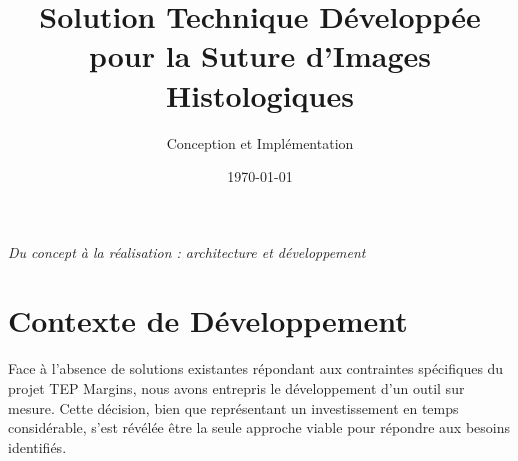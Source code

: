 \documentclass[11pt,a4paper]{article}
\title{\Huge\textbf{Solution Technique Développée\\pour la Suture d'Images Histologiques}}
\author{\Large Conception et Implémentation}
\date{\today}
\begin{document}
\maketitle

\begin{center}
\textit{\large Du concept à la réalisation : architecture et développement}
\end{center}

\vspace{1cm}

\tableofcontents

\newpage

\section{Contexte de Développement}

Face à l'absence de solutions existantes répondant aux contraintes spécifiques du projet TEP Margins, nous avons entrepris le développement d'un outil sur mesure. Cette décision, bien que représentant un investissement en temps considérable, s'est révélée être la seule approche viable pour répondre aux besoins identifiés.
\end{document}
